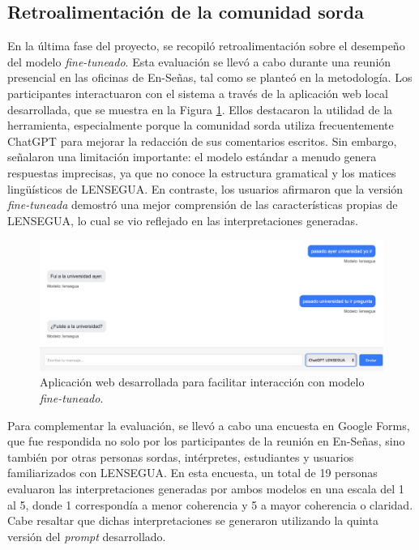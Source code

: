 \subsection{Retroalimentación de la comunidad sorda}

En la última fase del proyecto, se recopiló retroalimentación sobre el desempeño del modelo \textit{fine-tuneado}. Esta evaluación se llevó a cabo durante una reunión presencial en las oficinas de En-Señas, tal como se planteó en la metodología. Los participantes interactuaron con el sistema a través de la aplicación web local desarrollada, que se muestra en la Figura \ref{fig:web}. Ellos destacaron la utilidad de la herramienta, especialmente porque la comunidad sorda utiliza frecuentemente ChatGPT para mejorar la redacción de sus comentarios escritos. Sin embargo, señalaron una limitación importante: el modelo estándar a menudo genera respuestas imprecisas, ya que no conoce la estructura gramatical y los matices lingüísticos de LENSEGUA. En contraste, los usuarios afirmaron que la versión \textit{fine-tuneada} demostró una mejor comprensión de las características propias de LENSEGUA, lo cual se vio reflejado en las interpretaciones generadas.

\vspace{0.5cm}
\begin{figure}[H]
\centering
\includegraphics[width=1\linewidth]{figuras/lensegua-web.png}
\caption{Aplicación web desarrollada para facilitar interacción con modelo \textit{fine-tuneado}.}
\label{fig:web}
\end{figure}


Para complementar la evaluación, se llevó a cabo una encuesta en Google Forms, que fue respondida no solo por los participantes de la reunión en En-Señas, sino también por otras personas sordas, intérpretes, estudiantes y usuarios familiarizados con LENSEGUA. En esta encuesta, un total de 19 personas evaluaron las interpretaciones generadas por ambos modelos en una escala del 1 al 5, donde 1 correspondía a menor coherencia y 5 a mayor coherencia o claridad. Cabe resaltar que dichas interpretaciones se generaron utilizando la quinta versión del \textit{prompt} desarrollado.

